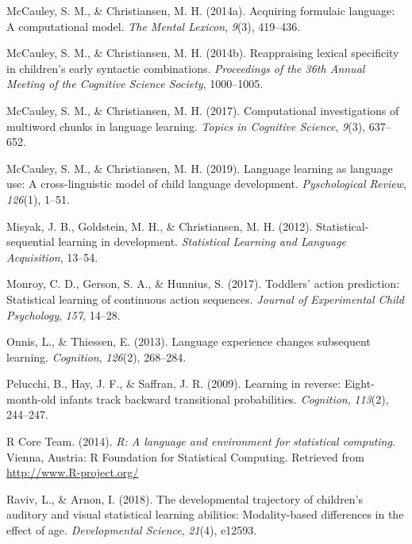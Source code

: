 \documentclass[man,mask,floatsintext]{apa6}
\begin{document}
\hypertarget{ref-mccauley2014acquiring}{}
McCauley, S. M., \& Christiansen, M. H. (2014a). Acquiring formulaic
language: A computational model. \emph{The Mental Lexicon}, \emph{9}(3),
419--436.

\hypertarget{ref-mccauley2014reappraising}{}
McCauley, S. M., \& Christiansen, M. H. (2014b). Reappraising lexical
specificity in children's early syntactic combinations.
\emph{Proceedings of the 36th Annual Meeting of the Cognitive Science
Society}, 1000--1005.

\hypertarget{ref-mccauley2017computational}{}
McCauley, S. M., \& Christiansen, M. H. (2017). Computational
investigations of multiword chunks in language learning. \emph{Topics in
Cognitive Science}, \emph{9}(3), 637--652.

\hypertarget{ref-mccauley2019languagelearning}{}
McCauley, S. M., \& Christiansen, M. H. (2019). Language learning as
language use: A cross-linguistic model of child language development.
\emph{Pyschological Review}, \emph{126}(1), 1--51.

\hypertarget{ref-misyak2012statistical}{}
Misyak, J. B., Goldstein, M. H., \& Christiansen, M. H. (2012).
Statistical-sequential learning in development. \emph{Statistical
Learning and Language Acquisition}, 13--54.

\hypertarget{ref-monroy2017toddlers}{}
Monroy, C. D., Gerson, S. A., \& Hunnius, S. (2017). Toddlers' action
prediction: Statistical learning of continuous action sequences.
\emph{Journal of Experimental Child Psychology}, \emph{157}, 14--28.

\hypertarget{ref-onnis2013language}{}
Onnis, L., \& Thiessen, E. (2013). Language experience changes
subsequent learning. \emph{Cognition}, \emph{126}(2), 268--284.

\hypertarget{ref-pelucchi2009learning}{}
Pelucchi, B., Hay, J. F., \& Saffran, J. R. (2009). Learning in reverse:
Eight-month-old infants track backward transitional probabilities.
\emph{Cognition}, \emph{113}(2), 244--247.

\hypertarget{ref-R}{}
R Core Team. (2014). \emph{R: A language and environment for statistical
computing}. Vienna, Austria: R Foundation for Statistical Computing.
Retrieved from \url{http://www.R-project.org/}

\hypertarget{ref-raviv2018developmental}{}
Raviv, L., \& Arnon, I. (2018). The developmental trajectory of
children's auditory and visual statistical learning abilities:
Modality-based differences in the effect of age. \emph{Developmental
Science}, \emph{21}(4), e12593.
\end{document}
